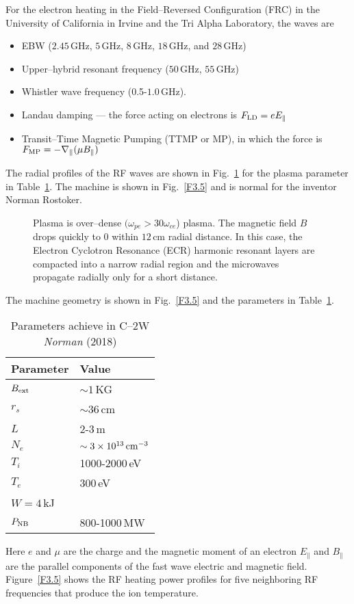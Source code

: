 \documentclass[a4paper,openany,12pt]{book}
\begin{document}
For the electron heating in the Field--Reversed Configuration (FRC) in the University of California in Irvine and the Tri Alpha Laboratory, the waves are
\begin{itemize}
\item EBW ($2.45\,$GHz, $5\,$GHz, $8\,$GHz, $18\,$GHz, and $28\,$GHz)
\item  Upper--hybrid resonant frequency ($50\,$GHz, $55\,$GHz)
\item Whistler wave frequency (0.5-$1.0\,$GHz).
\item Landau damping --- the force acting on electrons is $F_{\rm LD}=eE_\|$
\item Transit--Time Magnetic Pumping (TTMP or MP), in which the force is $F_{\rm MP}=-\nabla_\|(\mu B_\|)$
\end{itemize}
The radial profiles of the RF waves are shown in Fig.~\ref{F3.4} for the plasma parameter in Table~\ref{T3.1}. The machine is shown in Fig.~\ref{F3.5} and is normal for the inventor Norman Rostoker.
%
\begin{figure}[H]
\centerline{}
\caption{Plasma is over--dense $(\omega_{pe} > 30\omega_{ce}$) plasma. The magnetic field $B$ drops quickly to 0 within $12\,$cm radial distance. In this case, the Electron Cyclotron Resonance (ECR) harmonic resonant layers are compacted into a narrow radial region and the microwaves propagate radially only for a short distance.}
\label{F3.4}
\end{figure}
%

The machine geometry is shown in Fig.~\ref{F3.5} and the parameters in Table~\ref{T3.1}.
%
\begin{table}[H]
\begin{center}
\caption{Parameters achieve in C--2W \emph{Norman} (2018)}
\begin{tabular}{ll}\\\hline\hline
Parameter   &Value\\\hline
$B_{\rm ext}$   &$\sim 1\,$KG\\
$r_s$   &$\sim 36\,$cm\\
$L$   &2-3$\,$m\\
$N_e$   &$\sim 3\times 10^{13}\,\rm cm^{-3}$\\
$T_i$    &1000-2000$\,$eV\\
$T_e$   &300$\,$eV\\
$W=4\,$kJ  &\\
$P_{\rm NB}$      &800-1000$\,$MW\\\hline\hline
\end{tabular}
\label{T3.1}
\end{center}
\end{table}
%
Here $e$ and $\mu$ are the charge and the magnetic moment of an electron $E_\|$ and $B_\|$ are the parallel components of the fast wave electric and magnetic field. Figure~\ref{F3.5} shows the RF heating power profiles for five neighboring RF frequencies that produce the ion temperature.
\end{document}

